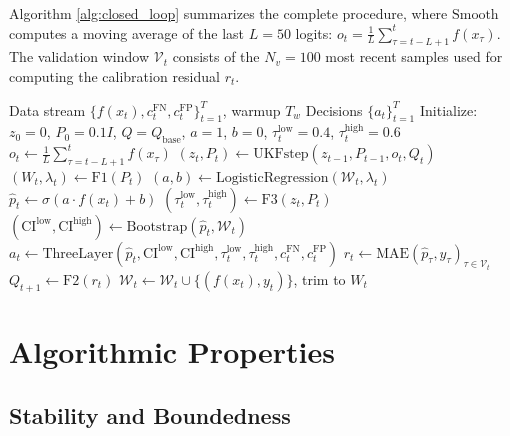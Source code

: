 \documentclass[12pt,a4paper]{article}
\begin{document}
Algorithm \ref{alg:closed_loop} summarizes the complete procedure, where $\text{Smooth}$ computes a moving average of the last $L=50$ logits: $o_t = \frac{1}{L}\sum_{\tau=t-L+1}^{t} f(x_\tau)$. The validation window $\mathcal{V}_t$ consists of the $N_v=100$ most recent samples used for computing the calibration residual $r_t$.

\begin{algorithm}[t]
\caption{Closed-loop adaptive Bayesian decision making}
\label{alg:closed_loop}
\begin{algorithmic}[1]
\Require Data stream $\{f(x_t), c^{\text{FN}}_t, c^{\text{FP}}_t\}_{t=1}^T$, warmup $T_w$
\Ensure Decisions $\{a_t\}_{t=1}^T$
\State Initialize: $z_0 = 0$, $P_0 = 0.1 I$, $Q = Q_{\text{base}}$, $a=1$, $b=0$, $\tau^{\text{low}}_t = 0.4$, $\tau^{\text{high}}_t = 0.6$
    \State $o_t \gets \frac{1}{L}\sum_{\tau=t-L+1}^{t} f(x_\tau)$ 
    \State $(z_t, P_t) \gets \text{UKFstep}(z_{t-1}, P_{t-1}, o_t, Q_t)$ 
        \State $(W_t, \lambda_t) \gets \text{F1}(P_t)$ 
    \EndIf
        \State $(a, b) \gets \text{LogisticRegression}(\mathcal{W}_t, \lambda_t)$ 
    \EndIf
    \State $\hat{p}_t \gets \sigma(a \cdot f(x_t) + b)$
        \State $(\tau^{\text{low}}_t, \tau^{\text{high}}_t) \gets \text{F3}(z_t, P_t)$ 
    \EndIf
    \State $(\text{CI}^{\text{low}}, \text{CI}^{\text{high}}) \gets \text{Bootstrap}(\hat{p}_t, \mathcal{W}_t)$
    \State $a_t \gets \text{ThreeLayer}(\hat{p}_t, \text{CI}^{\text{low}}, \text{CI}^{\text{high}}, \tau^{\text{low}}_t, \tau^{\text{high}}_t, c^{\text{FN}}_t, c^{\text{FP}}_t)$
        \State $r_t \gets \text{MAE}(\hat{p}_\tau, y_\tau)_{\tau \in \mathcal{V}_t}$
        \State $Q_{t+1} \gets \text{F2}(r_t)$ 
    \EndIf
    \State $\mathcal{W}_t \gets \mathcal{W}_t \cup \{(f(x_t), y_t)\}$, trim to $W_t$
\EndFor
\end{algorithmic}
\end{algorithm}

\section{Algorithmic Properties}
\label{sec:theory}

\subsection{Stability and Boundedness}
\end{document}
